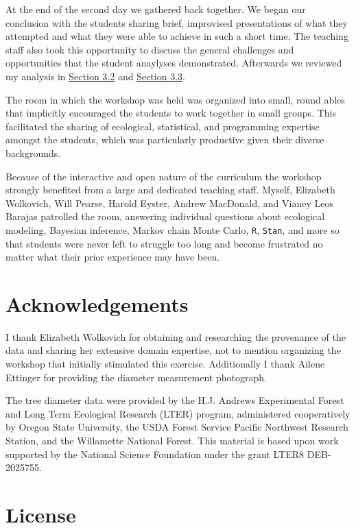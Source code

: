 \documentclass[
  letterpaper,
  DIV=11,
  numbers=noendperiod]{scrartcl}
\begin{document}
At the end of the second day we gathered back together. We began our
conclusion with the students sharing brief, improvised presentations of
what they attempted and what they were able to achieve in such a short
time. The teaching staff also took this opportunity to discuss the
general challenges and opportunities that the student anaylyses
demonstrated. Afterwards we reviewed my analysis in
\protect\hyperlink{sec:homo-linear}{Section 3.2} and
\protect\hyperlink{sec:gompertz}{Section 3.3}.

The room in which the workshop was held was organized into small, round
ables that implicitly encouraged the students to work together in small
groups. This facilitated the sharing of ecological, statistical, and
programming expertise amongst the students, which was particularly
productive given their diverse backgrounds.

Because of the interactive and open nature of the curriculum the
workshop strongly benefited from a large and dedicated teaching staff.
Myself, Elizabeth Wolkovich, Will Pearse, Harold Eyster, Andrew
MacDonald, and Vianey Leos Barajas patrolled the room, answering
individual questions about ecological modeling, Bayesian inference,
Markov chain Monte Carlo, \texttt{R}, \texttt{Stan}, and more so that
students were never left to struggle too long and become frustrated no
matter what their prior experience may have been.

\hypertarget{acknowledgements}{%
\section*{Acknowledgements}\label{acknowledgements}}

I thank Elizabeth Wolkovich for obtaining and researching the provenance
of the data and sharing her extensive domain expertise, not to mention
organizing the workshop that initially stimulated this exercise.
Additionally I thank Ailene Ettinger for providing the diameter
measurement photograph.

The tree diameter data were provided by the H.J. Andrews Experimental
Forest and Long Term Ecological Research (LTER) program, administered
cooperatively by Oregon State University, the USDA Forest Service
Pacific Northwest Research Station, and the Willamette National Forest.
This material is based upon work supported by the National Science
Foundation under the grant LTER8 DEB-2025755.

\hypertarget{license}{%
\section*{License}\label{license}}
\end{document}
